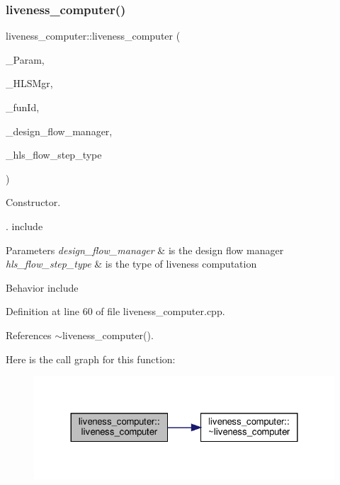 \subsubsection{\texorpdfstring{liveness\+\_\+computer()}{liveness\_computer()}}
{\footnotesize\ttfamily liveness\+\_\+computer\+::liveness\+\_\+computer (\begin{DoxyParamCaption}\item[{const \hyperlink{Parameter_8hpp_a37841774a6fcb479b597fdf8955eb4ea}{Parameter\+Const\+Ref}}]{\+\_\+\+Param,  }\item[{const \hyperlink{hls__manager_8hpp_acd3842b8589fe52c08fc0b2fcc813bfe}{H\+L\+S\+\_\+manager\+Ref}}]{\+\_\+\+H\+L\+S\+Mgr,  }\item[{unsigned int}]{\+\_\+fun\+Id,  }\item[{const Design\+Flow\+Manager\+Const\+Ref}]{\+\_\+design\+\_\+flow\+\_\+manager,  }\item[{const \hyperlink{hls__step_8hpp_ada16bc22905016180e26fc7e39537f8d}{H\+L\+S\+Flow\+Step\+\_\+\+Type}}]{\+\_\+hls\+\_\+flow\+\_\+step\+\_\+type }\end{DoxyParamCaption})}



Constructor. 

. include


\begin{DoxyParams}{Parameters}
{\em design\+\_\+flow\+\_\+manager} & is the design flow manager \\
\hline
{\em hls\+\_\+flow\+\_\+step\+\_\+type} & is the type of liveness computation\\
\hline
\end{DoxyParams}
Behavior include 

Definition at line 60 of file liveness\+\_\+computer.\+cpp.



References $\sim$liveness\+\_\+computer().

Here is the call graph for this function\+:
\nopagebreak
\begin{figure}[H]
\begin{center}
\leavevmode
\includegraphics[width=324pt]{dc/dc6/classliveness__computer_acfba7bac0a134cc6a1cc9c6d5e4974d5_cgraph}
\end{center}
\end{figure}
\mbox{\label{classliveness__computer_a9773b9fa9cea6b46dc78a43fcffee8b3}} 
